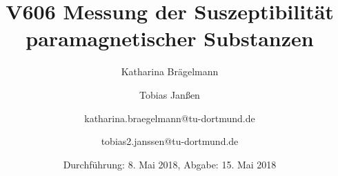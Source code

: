 
\title{V606 Messung der Suszeptibilität paramagnetischer Substanzen}
\author{Katharina Brägelmann \and Tobias Janßen \and katharina.braegelmann@tu-dortmund.de \and tobias2.janssen@tu-dortmund.de}
\date{Durchführung: 8. Mai 2018, Abgabe: 15. Mai 2018}
\maketitle

\tableofcontents
